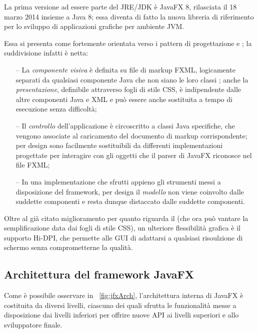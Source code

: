             La prima versione ad essere parte del JRE/JDK è JavaFX 8, rilasciata il 18 marzo 2014 insieme a Java 8; essa diventa di fatto la nuova libreria di riferimento per lo sviluppo di applicazioni grafiche per ambiente JVM.

            Essa si presenta come fortemente orientata verso i pattern di progettazione  e ; la suddivisione infatti è netta:
            \begin{itemize}
                \item[--] La \emph{componente visiva} è definita su file di markup FXML, logicamente separati da qualsiasi componente Java che non siano le loro classi ; anche la \emph{presentazione}, definibile attraverso fogli di stile CSS, è indipendente dalle altre componenti Java e XML e può essere anche sostituita a tempo di esecuzione senza difficoltà;
                \item[--] Il \emph{controllo} dell'applicazione è circoscritto a classi Java specifiche, che vengono associate al caricamento del documento di markup corrispondente; per design sono facilmente sostituibili da differenti implementazioni progettate per interagire con gli oggetti che il parser di JavaFX riconosce nel file FXML;
                \item[--] In una implementazione che sfrutti appieno gli strumenti messi a disposizione del framework, per design il \emph{modello} non viene coinvolto dalle suddette componenti e resta dunque distaccato dalle suddette componenti.
            \end{itemize}

            Oltre al già citato miglioramento per quanto riguarda il  (che ora può vantare la semplificazione data dai fogli di stile CSS), un ulteriore flessibilità grafica è il supporto Hi-DPI, che permette alle GUI di adattarsi a qualsiasi risoulzione di schermo senza comprometterne la qualità.

        \subsection{Architettura del framework JavaFX}\label{sub:jfxFramework}
            Come è possibile osservare in \figurename~\vref{fig:jfxArch}, l'architettura interna di JavaFX è costituita da diversi livelli, ciascuno dei quali sfrutta le funzionalità messe a disposizione dai livelli inferiori per offrire nuove API ai livelli superiori e allo sviluppatore finale.

